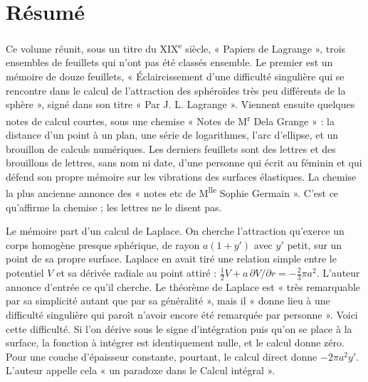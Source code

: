 \documentclass[11pt,a4paper]{article}
\begin{document}
\section*{Résumé}

\begin{resume}
Ce volume réunit, sous un titre du XIX\textsuperscript{e} siècle, « Papiers de
Lagrange », trois ensembles de feuillets qui n'ont pas été classés ensemble.
Le premier est un mémoire de douze feuillets, « Éclaircissement d'une
difficulté singulière qui se rencontre dans le calcul de l'attraction des
sphéroïdes très peu différents de la sphère », signé dans son titre « Par J. L.
Lagrange ». Viennent ensuite quelques notes de calcul courtes, sous une
chemise « Notes de M\textsuperscript{r} Dela Grange » : la distance d'un point
à un plan, une série de logarithmes, l'arc d'ellipse, et un brouillon de
calculs numériques. Les derniers feuillets sont des lettres et des brouillons
de lettres, sans nom ni date, d'une personne qui écrit au féminin et qui défend
son propre mémoire sur les vibrations des surfaces élastiques. La chemise la
plus ancienne annonce des « notes etc de M\textsuperscript{lle} Sophie Germain ».
C'est ce qu'affirme la chemise ; les lettres ne le disent pas.

Le mémoire part d'un calcul de Laplace. On cherche l'attraction qu'exerce un
corps homogène presque sphérique, de rayon \(a(1+y')\) avec \(y'\) petit, sur
un point de sa propre surface. Laplace en avait tiré une relation simple entre
le potentiel \(V\) et sa dérivée radiale au point attiré :
\(\tfrac12 V + a\,\partial V/\partial r = -\tfrac23\pi a^2\). L'auteur annonce
d'entrée ce qu'il cherche. Le théorème de Laplace est « très remarquable par sa
simplicité autant que par sa généralité », mais il « donne lieu à une difficulté
singulière qui paroît n'avoir encore été remarquée par personne ». Voici cette
difficulté. Si l'on dérive sous le signe d'intégration puis qu'on se place à la
surface, la fonction à intégrer est identiquement nulle, et le calcul donne
zéro. Pour une couche d'épaisseur constante, pourtant, le calcul direct donne
\(-2\pi a^2 y'\). L'auteur appelle cela « un paradoxe dans le Calcul
intégral ».


\end{resume}
\end{document}
